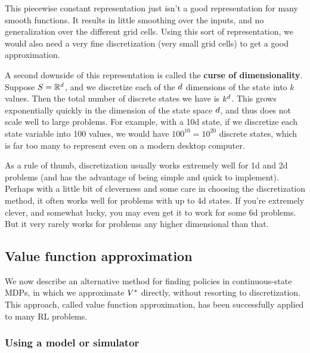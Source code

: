 \documentclass{article}
\begin{document}
This piecewise constant representation just isn't a good representation for
many smooth functions.  It results in little smoothing over the inputs, and no
generalization over the different grid cells.  Using this sort of representation,
we would also need a very fine discretization (very small grid cells) to get a good approximation.

A second downside of this representation is called the {\bf curse of
dimensionality}.  Suppose $S = {\mathbb R}^{d}$, and we discretize each of the ${d}$
dimensions of the state
into $k$ values.  Then the total number of discrete states we have is
$k^{d}$.  This grows exponentially quickly in the dimension of the state space ${d}$,
and thus does not scale well to large problems.  For example, with a 10d state,
if we discretize each state variable into 100 values, we would have
$100^{10} = 10^{20}$ discrete states, which is far too many to represent even on
a modern desktop computer.

As a rule of thumb, discretization usually works extremely well for 1d and 2d
problems (and has the advantage of being simple and quick to implement).
Perhaps with a little bit of cleverness and some care in choosing the
discretization method, it often works well for problems with up to 4d states.  If
you're extremely clever, and somewhat lucky, you may even get it to work for
some 6d problems.  But it very rarely works for problems any higher
dimensional than that.


\subsection{Value function approximation} \label{sec-valuefunapprox}

We now describe an alternative method for finding policies in continuous-state MDPs, in
which we approximate ${V^{\ast}}$
directly, without resorting to discretization.  This approach, called value function
approximation, has been successfully applied to many RL problems.

\subsubsection{Using a model or simulator}
\end{document}
